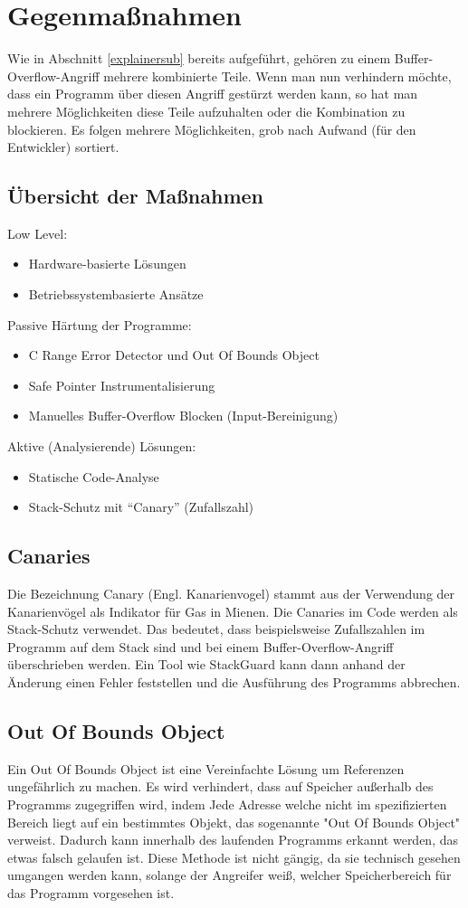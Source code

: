 \section{Gegenmaßnahmen}
Wie in Abschnitt \ref{explainersub} bereits aufgeführt,
gehören zu einem Buffer-Overflow-Angriff mehrere kombinierte Teile. Wenn
man nun verhindern möchte, dass ein Programm über diesen Angriff gestürzt werden
kann, so hat man mehrere Möglichkeiten diese Teile aufzuhalten oder die Kombination
zu blockieren. Es folgen mehrere Möglichkeiten, grob nach Aufwand (für den Entwickler) sortiert.
\subsection{Übersicht der Maßnahmen}
Low Level:
    \begin{itemize}
        \item Hardware-basierte Lösungen
        \item Betriebssystembasierte Ansätze
    \end{itemize}
Passive Härtung der Programme:
    \begin{itemize}
        \item C Range Error Detector und Out Of Bounds Object
        \item Safe Pointer Instrumentalisierung
        \item Manuelles Buffer-Overflow Blocken (Input-Bereinigung)
    \end{itemize}
Aktive (Analysierende) Lösungen:
    \begin{itemize}
        \item Statische Code-Analyse
        \item Stack-Schutz mit ``Canary'' (Zufallszahl)
    \end{itemize}

\subsection{Canaries}
Die Bezeichnung Canary (Engl. Kanarienvogel) stammt aus der Verwendung der Kanarienvögel als
Indikator für Gas in Mienen. Die Canaries im Code werden als Stack-Schutz verwendet. Das bedeutet,
dass beispielsweise Zufallszahlen im Programm auf dem Stack sind und bei einem Buffer-Overflow-Angriff
überschrieben werden. Ein Tool wie StackGuard kann dann anhand der Änderung einen Fehler feststellen und
die Ausführung des Programms abbrechen.

\subsection{Out Of Bounds Object}
Ein Out Of Bounds Object ist eine Vereinfachte Lösung um Referenzen ungefährlich zu machen.
Es wird verhindert, dass auf Speicher außerhalb des Programms zugegriffen wird, indem Jede
Adresse welche nicht im spezifizierten Bereich liegt auf ein bestimmtes Objekt, das sogenannte
"Out Of Bounds Object" verweist. Dadurch kann innerhalb des laufenden Programms erkannt werden, das
etwas falsch gelaufen ist. Diese Methode ist nicht gängig, da sie technisch gesehen
umgangen werden kann, solange der Angreifer weiß, welcher Speicherbereich für das Programm
vorgesehen ist.


